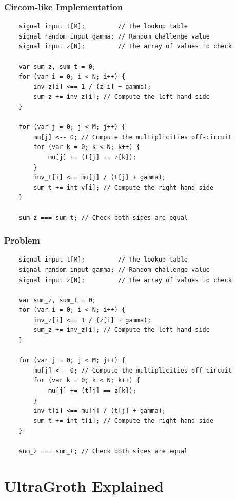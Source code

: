 \documentclass{zkdl-presentation-template}
\begin{document}
\begin{frame}[fragile]
    \frametitle{Circom-like Implementation}

    \begin{verbatim}
    signal input t[M];         // The lookup table
    signal random input gamma; // Random challenge value
    signal input z[N];         // The array of values to check

    var sum_z, sum_t = 0;
    for (var i = 0; i < N; i++) {
        inv_z[i] <== 1 / (z[i] + gamma);
        sum_z += inv_z[i]; // Compute the left-hand side
    }

    for (var j = 0; j < M; j++) {
        mu[j] <-- 0; // Compute the multiplicities off-circuit
        for (var k = 0; k < N; k++) {
            mu[j] += (t[j] == z[k]);
        }
        inv_t[i] <== mu[j] / (t[j] + gamma);
        sum_t += int_v[i]; // Compute the right-hand side
    }

    sum_z === sum_t; // Check both sides are equal
    \end{verbatim}
\end{frame}

\begin{frame}[fragile]
    \frametitle{Problem}

    \begin{verbatim}
    signal input t[M];         // The lookup table
    signal random input gamma; // Random challenge value
    signal input z[N];         // The array of values to check

    var sum_z, sum_t = 0;
    for (var i = 0; i < N; i++) {
        inv_z[i] <== 1 / (z[i] + gamma);
        sum_z += inv_z[i]; // Compute the left-hand side
    }

    for (var j = 0; j < M; j++) {
        mu[j] <-- 0; // Compute the multiplicities off-circuit
        for (var k = 0; k < N; k++) {
            mu[j] += (t[j] == z[k]);
        }
        inv_t[i] <== mu[j] / (t[j] + gamma);
        sum_t += int_t[i]; // Compute the right-hand side
    }

    sum_z === sum_t; // Check both sides are equal
    \end{verbatim}
\end{frame}

\section{UltraGroth Explained}
\end{document}
